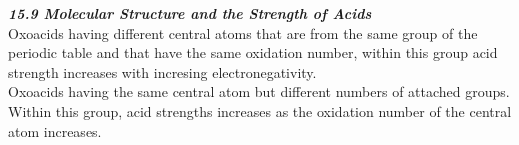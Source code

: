 \documentclass[./chem_exercises.tex]{subfiles}
\begin{document}
\begin{multicols}{2}
\textit{\textbf{ 15.9 Molecular Structure and the Strength of Acids } }\\ 

Oxoacids having different central atoms that are from the same group of the periodic table 
and that have the same oxidation number, within this group acid strength increases with incresing
electronegativity.\\

Oxoacids having the same central atom but different numbers of attached groups. Within this group, acid strengths
increases as the oxidation number of the central atom increases.\\


\end{multicols}












\end{document}
